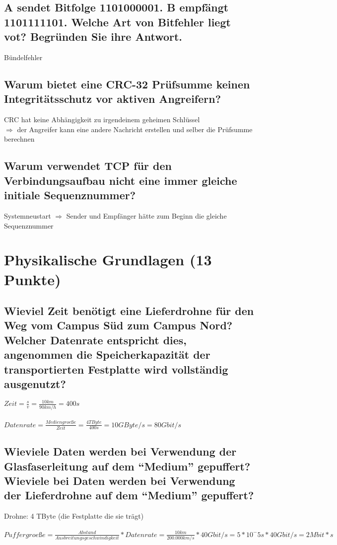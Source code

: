 \documentclass[a4paper]{article}
\begin{document}
\subsection{A sendet Bitfolge 1101000001. B empfängt 1101111101. Welche Art von Bitfehler liegt vot? Begründen Sie ihre Antwort.}
Bündelfehler
\subsection{Warum bietet eine CRC-32 Prüfsumme keinen Integritätsschutz vor aktiven Angreifern?}
CRC hat keine Abhängigkeit zu irgendeinem geheimen Schlüssel\\ 
$\Rightarrow$ der Angreifer kann eine andere Nachricht erstellen und selber die Prüfsumme berechnen
\subsection{Warum verwendet TCP für den Verbindungsaufbau nicht eine immer gleiche initiale Sequenznummer?}
Systemneustart $\Rightarrow$ Sender und Empfänger hätte zum Beginn die gleiche Sequenznummer

\pagebreak
\section{Physikalische Grundlagen (13 Punkte)}
\subsection{Wieviel Zeit benötigt eine Lieferdrohne für den Weg vom Campus Süd zum Campus Nord? Welcher Datenrate entspricht dies, angenommen die Speicherkapazität der transportierten Festplatte wird vollständig ausgenutzt?}
$Zeit =\frac{s}{v} = \frac{10km}{90km/h} = 400s$\\\\
$Datenrate = \frac{Mediengroeße}{Zeit} = \frac{4 TByte}{400s} = 10 GByte/s = 80 Gbit/s$
\subsection{Wieviele Daten werden bei Verwendung der Glasfaserleitung auf dem ``Medium'' gepuffert? Wieviele bei Daten werden bei Verwendung der Lieferdrohne auf dem ``Medium'' gepuffert?}
Drohne: 4 TByte (die Festplatte die sie trägt) \\\\
$Puffergroeße = \frac{Abstand}{Ausbreitungsgeschwindigkeit} * Datenrate = \frac{10km}{200.000 km/s} * 40 Gbit/s
= 5 * 10^-5 s * 40 Gbit/s = 2 Mbit*s $
\end{document}
